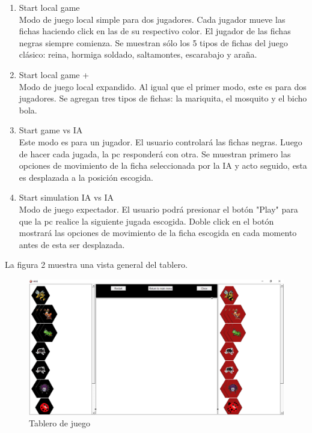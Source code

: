 \documentclass[a4paper,12pt]{article}
\begin{document}
\begin{enumerate}
\item Start local game\\
Modo de juego local simple para dos jugadores. Cada jugador mueve las fichas haciendo click en las de su respectivo color. El jugador de las fichas negras siempre comienza. Se muestran sólo los 5 tipos de fichas del juego clásico: reina, hormiga soldado, saltamontes, escarabajo y araña.

\item Start local game +\\
Modo de juego local expandido. Al igual que el primer modo, este es para dos jugadores. Se agregan tres tipos de fichas: la mariquita, el mosquito y el bicho bola.

\item Start game vs IA\\
Este modo es para un jugador. El usuario controlará las fichas negras. Luego de hacer cada jugada, la pc responderá con otra. Se muestran primero las opciones de movimiento de la ficha seleccionada por la IA y acto seguido, esta es desplazada a la posición escogida.

\item Start simulation IA vs IA\\
Modo de juego expectador. El usuario podrá presionar el botón "Play" para que la pc realice la siguiente jugada escogida. Doble click en el botón mostrará las opciones de movimiento de la ficha escogida en cada momento antes de esta ser desplazada.
\end{enumerate}

La figura 2 muestra una vista general del tablero.

\begin{figure}[H]
	\centering
	\includegraphics[width=0.9\linewidth]{./2}
	\caption{Tablero de juego}
	\label{fig:2}
\end{figure}
\end{document}
